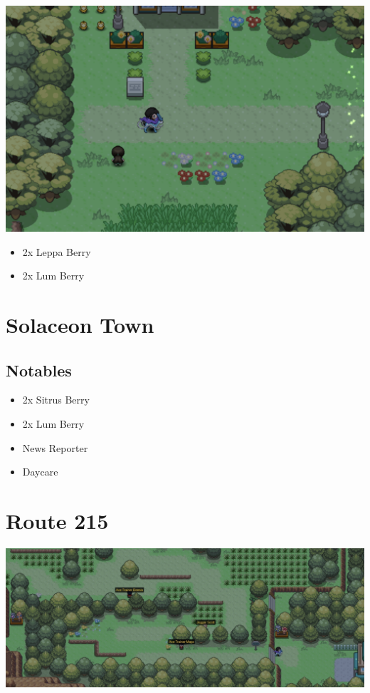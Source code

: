 \documentclass[11pt]{article}
\begin{document}
\includegraphics[width=\textwidth]{walkthrough/Sinnoh/Route_210}

\begin{itemize}
    \item 2x Leppa Berry
    \item 2x Lum Berry
\end{itemize}



\section{Solaceon Town}\label{sec:solaceon-town}

\subsection{Notables}\label{subsec:notables-solaceon-town}

\begin{itemize}
    \item 2x Sitrus Berry
    \item 2x Lum Berry
    \item News Reporter
    \item Daycare
\end{itemize}

\section{Route 215}\label{sec:Route_215}

\includegraphics[width=\textwidth]{walkthrough/Sinnoh/Route_215}
\end{document}
